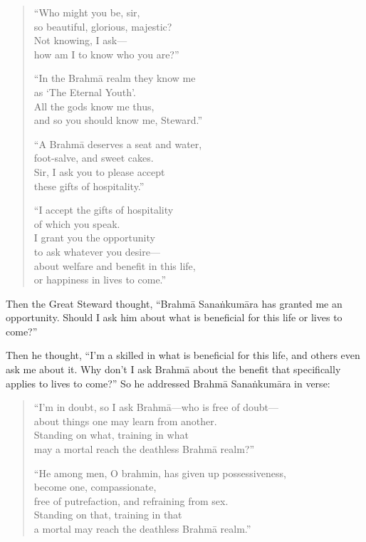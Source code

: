 \documentclass[12pt,openany]{book}%
\begin{document}
\begin{verse}%
“Who might you be, sir, \\
so beautiful, glorious, majestic? \\
Not knowing, I ask—\\
how am I to know who you are?” 

“In the \textsanskrit{Brahmā} realm they know me \\
as ‘The Eternal Youth’. \\
All the gods know me thus, \\
and so you should know me, Steward.” 

“A \textsanskrit{Brahmā} deserves a seat and water, \\
foot-salve, and sweet cakes. \\
Sir, I ask you to please accept \\
these gifts of hospitality.” 

“I accept the gifts of hospitality \\
of which you speak. \\
I grant you the opportunity \\
to ask whatever you desire—\\
about welfare and benefit in this life, \\
or happiness in lives to come.” 

%
\end{verse}

Then the Great Steward thought, “\textsanskrit{Brahmā} \textsanskrit{Sanaṅkumāra} has granted me an opportunity. Should I ask him about what is beneficial for this life or lives to come?” 

Then he thought, “I’m a skilled in what is beneficial for this life, and others even ask me about it. Why don’t I ask \textsanskrit{Brahmā} about the benefit that specifically applies to lives to come?” So he addressed \textsanskrit{Brahmā} \textsanskrit{Sanaṅkumāra} in verse: 

\begin{verse}%
“I’m in doubt, so I ask \textsanskrit{Brahmā}—who is free of doubt—\\
about things one may learn from another. \\
Standing on what, training in what \\
may a mortal reach the deathless \textsanskrit{Brahmā} realm?” 

“He among men, O brahmin, has given up possessiveness, \\
become one, compassionate, \\
free of putrefaction, and refraining from sex. \\
Standing on that, training in that \\
a mortal may reach the deathless \textsanskrit{Brahmā} realm.” 

%
\end{verse}
\end{document}
